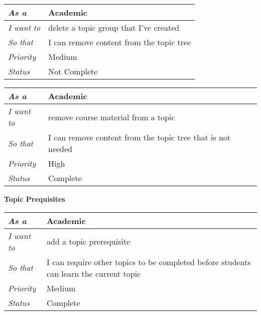 \begin{table}[]
\begin{tabular}{|l|l|}
\hline
\textit{As a}      & Academic                                 \\ \hline
\textit{I want to} & delete a topic group that I've created   \\ \hline
\textit{So that}   & I can remove content from the topic tree \\ \hline
\textit{Priority}  & {\color[HTML]{F8A102} Medium}              \\ \hline
\textit{Status}    & Not Complete                                 \\ \hline
\end{tabular}
\end{table}

\begin{table}[]
\begin{tabular}{|l|l|}
\hline
\textit{As a}      & Academic                                                    \\ \hline
\textit{I want to} & remove course material from a topic                         \\ \hline
\textit{So that}   & I can remove content from the topic tree that is not needed \\ \hline
\textit{Priority}  & {\color[HTML]{FE0000} High}                                 \\ \hline
\textit{Status}    & Complete                                                    \\ \hline
\end{tabular}
\end{table}

\textbf{Topic Prequisites}

\begin{table}[]
\begin{tabular}{|l|l|}
\hline
\textit{As a}      & Academic                                                                               \\ \hline
\textit{I want to} & add a topic prerequisite                                                               \\ \hline
\textit{So that}   & I can require other topics to be completed before students can learn the current topic \\ \hline
\textit{Priority}  & {\color[HTML]{FE996B} Medium}                                                            \\ \hline
\textit{Status}    & Complete                                                                               \\ \hline
\end{tabular}
\end{table}

